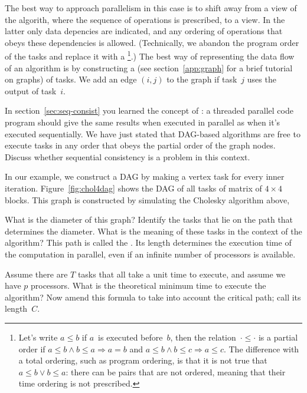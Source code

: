 The best way to approach parallelism in this case is to shift away
from a  view of the algorith, where the
sequence of operations is prescribed, to a  view.
In the latter only data depencies are indicated, and any ordering of
operations that obeys these dependencies is allowed. (Technically, we
abandon the program order of the tasks and replace it with a
\footnote{Let's write $a\leq b$ if $a$~is
  executed before~$b$, then the relation~$\cdot\leq\cdot$ is a partial
  order if $a\leq b\wedge b\leq a\Rightarrow a=b$ and $a\leq b\wedge
  b\leq c\Rightarrow a\leq c$. The difference with a total ordering,
  such as program ordering, is that it is not true that $a\leq b\vee
  b\leq a$: there can be pairs that are not ordered, meaning that
  their time ordering is not prescribed.}.)  The best way of
representing the data flow of an algorithm is by constructing a
 (see section~\ref{app:graph} for a brief tutorial on
graphs) of tasks.  We add an edge $(i,j)$ to the graph if task~$j$
uses the output of task~$i$.

\begin{exercise}
  In section~\ref{sec:seq-consist} you learned the concept of
  : a threaded parallel code program
  should give the same results when executed in parallel as when it's
  executed sequentially. We have just stated that \ac{DAG}-based
  algorithms are free to execute tasks in any order that obeys the
  partial order of the graph nodes. Discuss whether
  sequential consistency is a problem in this context.
\end{exercise}

In our example, we construct a \ac{DAG} by making a vertex task for every
inner iteration.
Figure~\ref{fig:chol4dag} shows the \ac{DAG} of all tasks
of matrix of $4\times4$ blocks. This graph is constructed by
simulating the Cholesky algorithm above, 

\begin{exercise}
  What is the diameter of this graph? Identify the tasks that lie on
  the path that determines the diameter. What is the meaning of these
  tasks in the context of the algorithm? This path is called the
  . Its length determines the execution time of the
  computation in parallel, even if an infinite number of processors is
  available.
\end{exercise}

\begin{exercise}
  Assume there are $T$ tasks that all take a unit time to execute, and
  assume we have $p$ processors. What is the
  theoretical minimum time to execute the algorithm? Now amend this
  formula to take into account the critical path; call its length~$C$.
\end{exercise}

